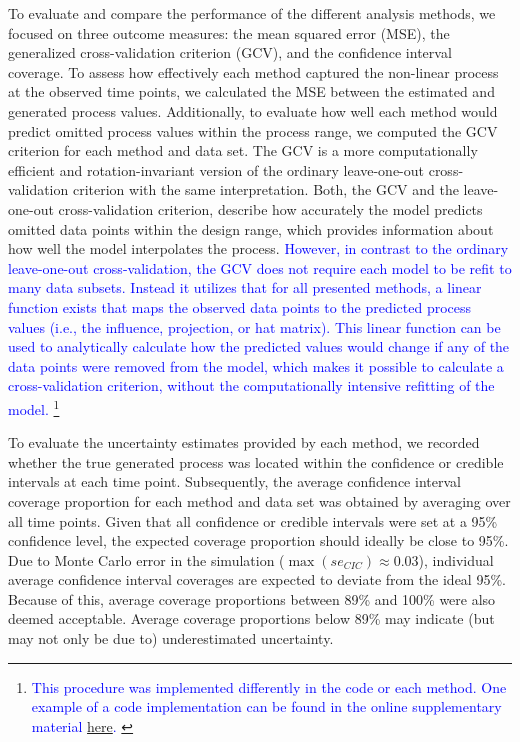 \documentclass[man, floatsintext]{apa7}
\begin{document}
To evaluate and compare the performance of the different analysis methods, we
focused on three outcome measures: the mean squared error (MSE), the
generalized cross-validation criterion (GCV), and the confidence interval
coverage. To assess how effectively each method captured the non-linear process
at the observed time points, we calculated the MSE between the estimated and
generated process values. Additionally, to evaluate how well each method would
predict omitted process values within the process range, we computed the GCV
\parencite{golub_generalized_1979} criterion for each method and data set. The
GCV is a more computationally efficient and rotation-invariant version of the
ordinary leave-one-out cross-validation criterion with the same interpretation.
Both, the GCV and the leave-one-out cross-validation criterion, describe how
accurately the model predicts omitted data points within the design range,
which provides information about how well the model interpolates the process.
\textcolor{blue}{However, in contrast to the ordinary leave-one-out
  cross-validation, the GCV does not require each model to be refit to many
  data
  subsets. Instead it utilizes that for all presented methods, a linear
  function
  exists that maps the observed data points to the predicted process values
  (i.e., the influence, projection, or hat matrix). This linear function can be
  used to analytically calculate how the predicted values would change if any
  of
  the data points were removed from the model, which makes it possible to
  calculate a cross-validation criterion, without the computationally intensive
  refitting of the model.}
\footnote{\textcolor{blue}{This procedure was implemented differently
    in the code or each method. One example of a code implementation can
    be found in the online supplementary material
    \href{https://shorturl.at/Lhv9N}{here}.
  }}

To evaluate the uncertainty estimates provided by each method, we recorded
whether the true generated process was located within the confidence or
credible intervals at each time point. Subsequently, the average confidence
interval coverage proportion for each method and data set was obtained by
averaging over all time points. Given that all confidence or credible intervals
were set at a 95\% confidence level, the expected coverage proportion should
ideally be close to 95\%. Due to Monte Carlo error in the simulation
($\max(se_{CIC}) \approx 0.03$), individual average confidence interval
coverages are expected to deviate from the ideal 95\%. Because of this, average
coverage proportions between 89\% and 100\% were also deemed acceptable.
Average coverage proportions below 89\% may indicate (but may not only be due
to) underestimated uncertainty.
\end{document}
